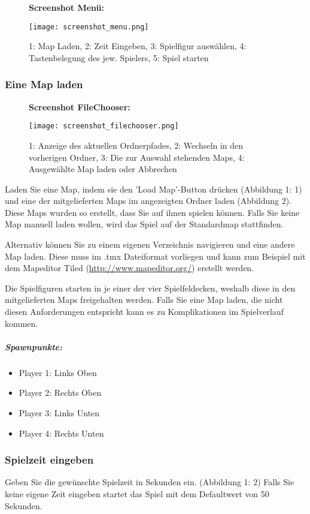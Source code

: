 \documentclass[a4paper]{scrartcl}
\begin{document}
\begin{figure}[H]
  \textbf{Screenshot Menü:}\par\medskip
  \centering
\texttt{[image: screenshot\_menu.png]}
\caption{1: Map Laden, 2: Zeit Eingeben, 3: Spielfigur auswählen, 4: Tastenbelegung des jew. Spielers,
5: Spiel starten}
\end{figure}



\subsubsection{Eine Map laden}
\begin{figure}[H]
  \textbf{Screenshot FileChooser:}\par\medskip
  \centering
\texttt{[image: screenshot\_filechooser.png]}  
\caption{1: Anzeige des aktuellen Ordnerpfades, 2: Wechseln in den vorherigen Ordner, 3: Die zur Auswahl stehenden Maps, 4: Ausgewählte Map laden oder Abbrechen}
\end{figure}
 
Laden Sie eine Map, indem sie den 'Load Map'-Button drücken (Abbildung 1: 1) und eine der mitgelieferten Maps im angezeigten Ordner laden (Abbildung 2). Diese Maps wurden so erstellt, dass Sie auf ihnen spielen können. Falls Sie keine Map manuell laden wollen, wird das Spiel auf der Standardmap stattfinden. 


Alternativ können Sie zu einem eigenen Verzeichnis navigieren und eine andere Map laden. Diese muss im .tmx Dateiformat vorliegen und kann zum Beispiel mit dem Mapeditor Tiled (\url{http://www.mapeditor.org/}) erstellt werden. 

Die Spielfiguren starten in je einer der vier Spielfeldecken, weshalb diese in den mitgelieferten Maps freigehalten werden. Falls Sie eine Map laden, die nicht diesen Anforderungen entspricht kann es zu Komplikationen im Spielverlauf kommen.
\subparagraph{Spawnpunkte:}
\begin{itemize}
\item Player 1: Links Oben
\item Player 2: Rechts Oben
\item Player 3: Links Unten
\item Player 4: Rechts Unten
\end{itemize}

\subsubsection{Spielzeit eingeben}
Geben Sie die gewünschte Spielzeit in Sekunden ein. (Abbildung 1: 2) Falls Sie keine eigene Zeit eingeben startet das Spiel mit dem Defaultwert von 50 Sekunden. 
\end{document}
